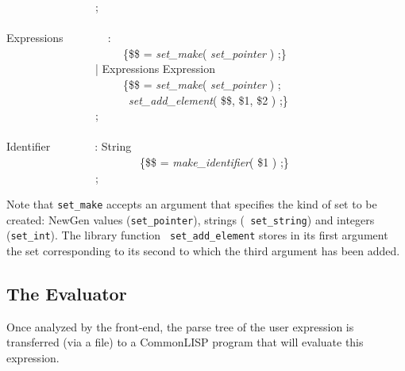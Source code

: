\begin{pgm}
~~~~~~~~~~~~~~~~; \\
 \\
Expressions~~~~~~~~: \\
~~~~~~~~~~~~~~~~~~~~~\{\$\$ = {\sl set\_make}( {\sl set\_pointer} ) ;\} \\
~~~~~~~~~~~~~~~~| Expressions Expression  \\
~~~~~~~~~~~~~~~~~~~~~\{\$\$ = {\sl set\_make}( {\sl set\_pointer} ) ; \\
~~~~~~~~~~~~~~~~~~~~~~{\sl set\_add\_element}( \$\$, \$1, \$2 ) ;\} \\
~~~~~~~~~~~~~~~~; \\
 \\
Identifier~~~~~~~~: String  \\
~~~~~~~~~~~~~~~~~~~~~~~~\{\$\$ = {\sl make\_identifier}( \$1 ) ;\} \\
~~~~~~~~~~~~~~~~; 
\end{pgm}
Note that {\tt set\_make} accepts an argument that specifies the kind of
set to be created: NewGen values ({\tt set\_pointer}), strings ({\tt
set\_string}) and integers ({\tt set\_int}). The library function {\tt
set\_add\_element} stores in its first argument the set corresponding to
its second to which the third argument has been added.

\subsection{The Evaluator}

Once analyzed by the front-end, the parse tree of the user expression is
transferred (via a file) to a CommonLISP program that will evaluate this
expression.

